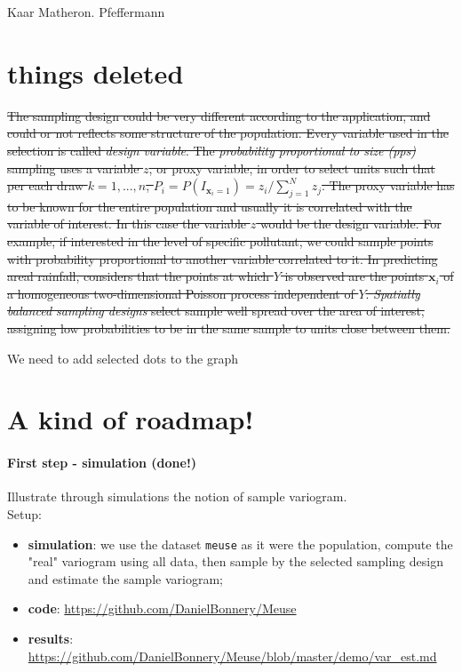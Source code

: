 \documentclass[12pt]{article}
\theoremstyle{definition}
\theoremstyle{remark}
\newcommand{\position}{\mathbf{x}}
\newcommand{\Signal}{Y}
\begin{document}
Kaar
Matheron.
Pfeffermann

\section{things deleted}

\sout{The sampling design could be very different according to the application, and could or not reflects some structure of the population. Every variable used in the selection is called \emph{design variable}. The \emph{probability proportional to size (pps)} sampling uses a variable $z$, or proxy variable, in order to select units  such that per each draw $k=1,...,n$, $P_{i}=P\left(I_{\position_{i}=1}\right)=z_{i}/\sum_{j=1}^{N}{z_{j}}$. The proxy variable has to be known for the entire population and usually it is correlated with the variable of interest. In this case the variable $z$ would be the design variable. For example, if interested in the level of specific pollutant, we could sample points with probability proportional to another variable correlated to it. In predicting areal rainfall, \cite{Kaar} considers that the points at which $Y$ is observed are the points $\position_{i}$ of a homogeneous two-dimensional Poisson process independent of $\Signal$. \emph{Spatially balanced sampling designs} select sample well spread over the area of interest, assigning low probabilities to be in the same sample to units close between them.}

{\color{red}
We need to add selected dots to the graph}




\appendix
\section{A kind of roadmap!}

    \paragraph{First step - simulation (done!)}
Illustrate through simulations the notion of sample variogram.\\
Setup:
\begin{itemize}    

    \item \textbf{simulation}: we use the dataset \texttt{meuse} as it were the population, compute the "real" variogram using all data, then sample by the selected sampling design and estimate the sample variogram;
    \item \textbf{code}: \url{https://github.com/DanielBonnery/Meuse}
    \item \textbf{results}: \url{https://github.com/DanielBonnery/Meuse/blob/master/demo/var_est.md}
\end{itemize}
\end{document}
